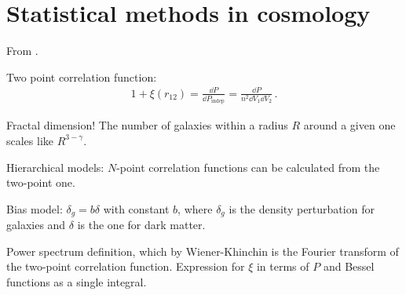 \documentclass[main.tex]{subfiles}
\begin{document}
\section{Statistical methods in cosmology}


From \cite[sec.\ 4]{nataleNoteCorsoDi2017}.

Two point correlation function: 
%
\begin{align}
1 + \xi (r_{12} ) = \frac{ \dd{P}}{ \dd{P} _{\text{indep}}} = \frac{ \dd{P}}{ n^2 \dd{V_1} \dd{V_2}}
\,.
\end{align}
%

Fractal dimension! 
The number of galaxies within a radius \(R\) around a given one scales like \(R^{3-\gamma }\).

Hierarchical models: \(N\)-point correlation functions can be calculated from the two-point one. 

Bias model: \(\delta _g = b \delta \) with constant \(b\), where \(\delta_g \) is the density perturbation for galaxies and \(\delta \) is the one for dark matter.

Power spectrum definition, which by Wiener-Khinchin is the Fourier transform of the two-point correlation function. 
Expression for \(\xi \) in terms of \(P\) and Bessel functions as a single integral.
\end{document}
